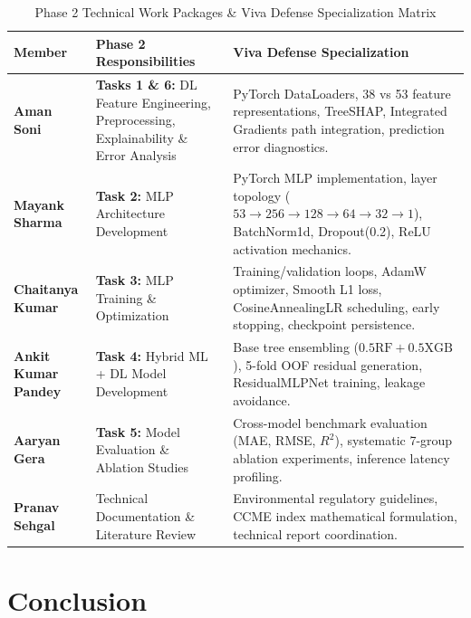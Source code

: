 \documentclass[conference]{IEEEtran}
\begin{document}
\begin{table}[!t]
  \caption{Phase 2 Technical Work Packages \& Viva Defense Specialization Matrix}
  \label{tab:team_contributions}
  \centering
  \setlength{\tabcolsep}{2.5pt}
  \begin{tabular}{p{1.6cm}p{2.7cm}p{3.8cm}}
    \toprule
    \textbf{Member} & \textbf{Phase 2 Responsibilities} & \textbf{Viva Defense Specialization} \\
    \midrule
    \textbf{Aman Soni}
      & \textbf{Tasks 1 \& 6:} DL Feature Engineering, Preprocessing, Explainability \& Error Analysis
      & PyTorch DataLoaders, 38 vs 53 feature representations, TreeSHAP, Integrated Gradients path integration, prediction error diagnostics. \\
    \midrule
    \textbf{Mayank Sharma}
      & \textbf{Task 2:} MLP Architecture Development
      & PyTorch MLP implementation, layer topology ($53\to 256\to 128\to 64\to 32\to 1$), BatchNorm1d, Dropout(0.2), ReLU activation mechanics. \\
    \midrule
    \textbf{Chaitanya Kumar}
      & \textbf{Task 3:} MLP Training \& Optimization
      & Training/validation loops, AdamW optimizer, Smooth L1 loss, CosineAnnealingLR scheduling, early stopping, checkpoint persistence. \\
    \midrule
    \textbf{Ankit Kumar Pandey}
      & \textbf{Task 4:} Hybrid ML + DL Model Development
      & Base tree ensembling ($0.5\text{RF}+0.5\text{XGB}$), 5-fold OOF residual generation, ResidualMLPNet training, leakage avoidance. \\
    \midrule
    \textbf{Aaryan Gera}
      & \textbf{Task 5:} Model Evaluation \& Ablation Studies
      & Cross-model benchmark evaluation (MAE, RMSE, $R^2$), systematic 7-group ablation experiments, inference latency profiling. \\
    \midrule
    \textbf{Pranav Sehgal}
      & Technical Documentation \& Literature Review
      & Environmental regulatory guidelines, CCME index mathematical formulation, technical report coordination. \\
    \bottomrule
  \end{tabular}
\end{table}

\section{Conclusion}
\label{sec:conclusion}
\end{document}
